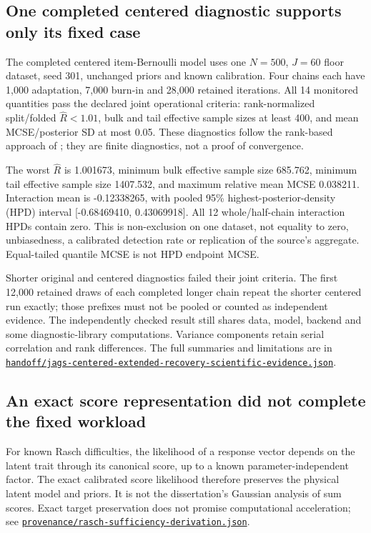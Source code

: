 \documentclass[11pt]{article}
\newcommand{\file}[1]{\href{https://github.com/alectionary/vibe-math/blob/master/formalization/schwabe-psychometric-genetics/#1}{\nolinkurl{#1}}}
\begin{document}
\subsection{One completed centered diagnostic supports only its fixed case}
The completed centered item-Bernoulli model uses one $N=500$, $J=60$ floor dataset, seed 301, unchanged priors and known calibration. Four chains each have 1,000 adaptation, 7,000 burn-in and 28,000 retained iterations. All 14 monitored quantities pass the declared joint operational criteria: rank-normalized split/folded $\widehat R<1.01$, bulk and tail effective sample sizes at least 400, and mean MCSE/posterior SD at most 0.05. These diagnostics follow the rank-based approach of \citet{vehtari2021}; they are finite diagnostics, not a proof of convergence.

The worst $\widehat R$ is 1.001673, minimum bulk effective sample size 685.762, minimum tail effective sample size 1407.532, and maximum relative mean MCSE 0.038211. Interaction mean is -0.12338265, with pooled 95\% highest-posterior-density (HPD) interval [-0.68469410, 0.43069918]. All 12 whole/half-chain interaction HPDs contain zero. This is non-exclusion on one dataset, not equality to zero, unbiasedness, a calibrated detection rate or replication of the source's aggregate. Equal-tailed quantile MCSE is not HPD endpoint MCSE.

Shorter original and centered diagnostics failed their joint criteria. The first 12,000 retained draws of each completed longer chain repeat the shorter centered run exactly; those prefixes must not be pooled or counted as independent evidence. The independently checked result still shares data, model, backend and some diagnostic-library computations. Variance components retain serial correlation and rank differences. The full summaries and limitations are in \file{handoff/jags-centered-extended-recovery-scientific-evidence.json}.

\subsection{An exact score representation did not complete the fixed workload}
For known Rasch difficulties, the likelihood of a response vector depends on the latent trait through its canonical score, up to a known parameter-independent factor. The exact calibrated score likelihood therefore preserves the physical latent model and priors. It is not the dissertation's Gaussian analysis of sum scores. Exact target preservation does not promise computational acceleration; see \file{provenance/rasch-sufficiency-derivation.json}.
\end{document}
